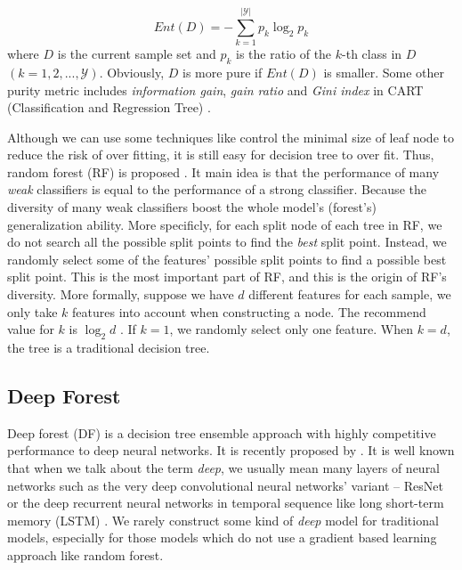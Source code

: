 \documentclass[sigconf]{acmart}
\begin{document}
	\begin{equation}
		Ent(D)=-\sum_{k=1}^{|\mathcal{Y}|}p_k\log_2p_k
	\end{equation}
	where $D$ is the current sample set and $p_k$ is the ratio of the $k$-th class in $D$ $(k=1,2,...,\mathcal{Y})$. Obviously, $D$ is more pure if $Ent(D)$ is smaller.
	Some other purity metric includes \textit{information gain}, \textit{gain ratio} and \textit{Gini index} in CART (Classification and Regression Tree)  \cite{breiman1984classification}.
	
	Although we can use some techniques like control the minimal size of leaf node to reduce the risk of over fitting, it is still easy for decision tree to over fit. Thus, random forest (RF) is proposed \cite{breiman2001random}. It main idea is that the performance of many \textit{weak} classifiers is equal to the performance of a strong classifier. Because the diversity of many weak classifiers boost the whole model's (forest's) generalization ability. More specificly, for each split node of each tree in  RF, we do not search all the possible split points to find the \textit{best} split point. Instead, we randomly select some of the features' possible split points to find a possible best split point. This is the most important part of RF, and this is the origin of RF's diversity. More formally, suppose we have $d$ different features for each sample, we only take $k$ features into account when constructing a node. The recommend value for $k$ is $\log_2d$ \cite{breiman2001random}. If $k=1$, we randomly select only one feature. When $k=d$, the
	tree is a traditional decision tree.
	
	
	\subsection{Deep Forest}
	Deep forest (DF) is a decision tree ensemble approach with highly competitive performance to deep neural networks. It is recently proposed by \citet{zhou2017deep}. It is well known that when we talk about the term \textit{deep}, we usually mean many layers of neural networks such as the very deep convolutional neural networks' variant -- ResNet \cite{he2016deep} or the deep recurrent neural networks in temporal sequence like long short-term memory (LSTM) \cite{hochreiter1997long}. We rarely construct some kind of \textit{deep} model for traditional models, especially for those models which do not use a gradient based learning approach like random forest.
	
\end{document}
